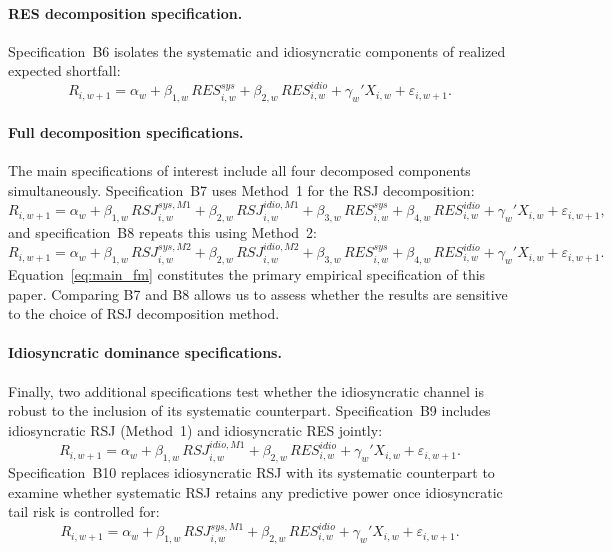 \documentclass[11pt,a4paper]{article}
\begin{document}
\paragraph{RES decomposition specification.}
Specification~B6 isolates the systematic and idiosyncratic components of
realized expected shortfall:
\begin{equation}
R_{i,w+1} = \alpha_w + \beta_{1,w}\,RES^{sys}_{i,w}
+ \beta_{2,w}\,RES^{idio}_{i,w}
+ \gamma_w' X_{i,w} + \varepsilon_{i,w+1}.
\label{eq:B6}
\end{equation}

\paragraph{Full decomposition specifications.}
The main specifications of interest include all four decomposed
components simultaneously. Specification~B7 uses Method~1 for the RSJ
decomposition:
\begin{equation}
R_{i,w+1} = \alpha_w
+ \beta_{1,w}\,RSJ^{sys,M1}_{i,w}
+ \beta_{2,w}\,RSJ^{idio,M1}_{i,w}
+ \beta_{3,w}\,RES^{sys}_{i,w}
+ \beta_{4,w}\,RES^{idio}_{i,w}
+ \gamma_w' X_{i,w}
+ \varepsilon_{i,w+1},
\label{eq:main_fm}
\end{equation}
and specification~B8 repeats this using Method~2:
\begin{equation}
R_{i,w+1} = \alpha_w
+ \beta_{1,w}\,RSJ^{sys,M2}_{i,w}
+ \beta_{2,w}\,RSJ^{idio,M2}_{i,w}
+ \beta_{3,w}\,RES^{sys}_{i,w}
+ \beta_{4,w}\,RES^{idio}_{i,w}
+ \gamma_w' X_{i,w}
+ \varepsilon_{i,w+1}.
\label{eq:B8}
\end{equation}
Equation~\eqref{eq:main_fm} constitutes the primary empirical
specification of this paper. Comparing B7 and B8 allows us to assess
whether the results are sensitive to the choice of RSJ decomposition
method.

\paragraph{Idiosyncratic dominance specifications.}
Finally, two additional specifications test whether the idiosyncratic
channel is robust to the inclusion of its systematic counterpart.
Specification~B9 includes idiosyncratic RSJ (Method~1) and idiosyncratic
RES jointly:
\begin{equation}
R_{i,w+1} = \alpha_w
+ \beta_{1,w}\,RSJ^{idio,M1}_{i,w}
+ \beta_{2,w}\,RES^{idio}_{i,w}
+ \gamma_w' X_{i,w}
+ \varepsilon_{i,w+1}.
\label{eq:B9}
\end{equation}
Specification~B10 replaces idiosyncratic RSJ with its systematic
counterpart to examine whether systematic RSJ retains any predictive
power once idiosyncratic tail risk is controlled for:
\begin{equation}
R_{i,w+1} = \alpha_w
+ \beta_{1,w}\,RSJ^{sys,M1}_{i,w}
+ \beta_{2,w}\,RES^{idio}_{i,w}
+ \gamma_w' X_{i,w}
+ \varepsilon_{i,w+1}.
\label{eq:B10}
\end{equation}
\end{document}
